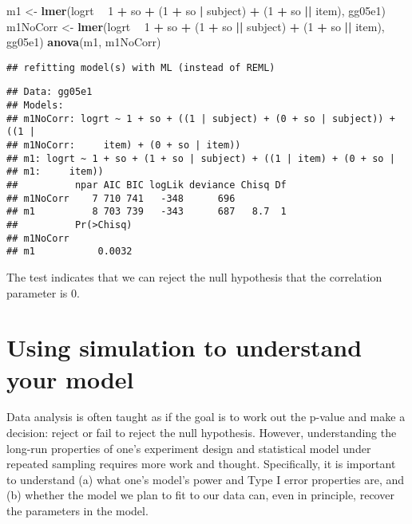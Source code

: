\documentclass[12pt,]{krantz}
\newenvironment{Shaded}{\begin{snugshade}}{\end{snugshade}}
\newcommand{\DecValTok}[1]{\textcolor[rgb]{0.00,0.00,0.81}{#1}}
\newcommand{\KeywordTok}[1]{\textcolor[rgb]{0.13,0.29,0.53}{\textbf{#1}}}
\newcommand{\NormalTok}[1]{#1}
\newcommand{\OperatorTok}[1]{\textcolor[rgb]{0.81,0.36,0.00}{\textbf{#1}}}
\newcommand{\StringTok}[1]{\textcolor[rgb]{0.31,0.60,0.02}{#1}}
\begin{document}
\begin{Shaded}
\begin{Highlighting}[]
\NormalTok{m1 <-}\StringTok{ }\KeywordTok{lmer}\NormalTok{(logrt }\OperatorTok{~}\StringTok{ }\DecValTok{1} \OperatorTok{+}\StringTok{ }\NormalTok{so }\OperatorTok{+}\StringTok{ }\NormalTok{(}\DecValTok{1} \OperatorTok{+}\StringTok{ }\NormalTok{so }\OperatorTok{|}\StringTok{ }\NormalTok{subject) }\OperatorTok{+}\StringTok{ }
\StringTok{  }\NormalTok{(}\DecValTok{1} \OperatorTok{+}\StringTok{ }\NormalTok{so }\OperatorTok{||}\StringTok{ }\NormalTok{item), gg05e1)}
\NormalTok{m1NoCorr <-}\StringTok{ }\KeywordTok{lmer}\NormalTok{(logrt }\OperatorTok{~}\StringTok{ }\DecValTok{1} \OperatorTok{+}\StringTok{ }\NormalTok{so }\OperatorTok{+}\StringTok{ }\NormalTok{(}\DecValTok{1} \OperatorTok{+}\StringTok{ }\NormalTok{so }\OperatorTok{||}\StringTok{ }
\StringTok{  }\NormalTok{subject) }\OperatorTok{+}\StringTok{ }\NormalTok{(}\DecValTok{1} \OperatorTok{+}\StringTok{ }\NormalTok{so }\OperatorTok{||}\StringTok{ }\NormalTok{item), gg05e1)}
\KeywordTok{anova}\NormalTok{(m1, m1NoCorr)}
\end{Highlighting}
\end{Shaded}

\begin{verbatim}
## refitting model(s) with ML (instead of REML)
\end{verbatim}

\begin{verbatim}
## Data: gg05e1
## Models:
## m1NoCorr: logrt ~ 1 + so + ((1 | subject) + (0 + so | subject)) + ((1 | 
## m1NoCorr:     item) + (0 + so | item))
## m1: logrt ~ 1 + so + (1 + so | subject) + ((1 | item) + (0 + so | 
## m1:     item))
##          npar AIC BIC logLik deviance Chisq Df
## m1NoCorr    7 710 741   -348      696         
## m1          8 703 739   -343      687   8.7  1
##          Pr(>Chisq)
## m1NoCorr           
## m1           0.0032
\end{verbatim}

The test indicates that we can reject the null hypothesis that the correlation parameter is 0.

\hypertarget{using-simulation-to-understand-your-model}{%
\chapter{Using simulation to understand your model}\label{using-simulation-to-understand-your-model}}

Data analysis is often taught as if the goal is to work out the p-value and make a decision: reject or fail to reject the null hypothesis. However, understanding the long-run properties of one's experiment design and statistical model under repeated sampling requires more work and thought. Specifically, it is important to understand (a) what one's model's power and Type I error properties are, and (b) whether the model we plan to fit to our data can, even in principle, recover the parameters in the model.
\end{document}
